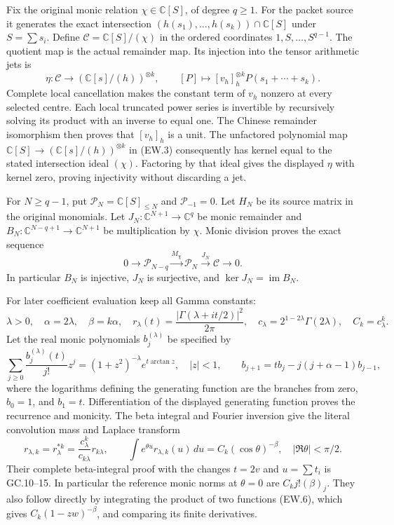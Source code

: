 \documentclass[11pt]{article}
\newcommand{\C}{\mathbb C}
\begin{document}
Fix the original monic relation $\chi\in\C[S]$, of degree $q\ge1$.
For the packet source it generates the exact intersection
$(h(s_1),\ldots,h(s_k))\cap\C[S]$ under $S=\sum s_i$.
Define $\mathcal C=\C[S]/(\chi)$ in the ordered coordinates
$1,S,\ldots,S^{q-1}$. The quotient map is the actual remainder
map. Its injection into the tensor arithmetic jets is
\[
 \eta:\mathcal C\longrightarrow(\C[s]/(h))^{\otimes k},
 \qquad [P]\longmapsto[v_h]_h^{\otimes k}P(s_1+\cdots+s_k).
                                                               \tag{EW.3}
\]
Complete local cancellation makes the constant term of $v_h$ nonzero
at every selected centre. Each local truncated power series is
invertible by recursively solving its product with an inverse to
equal one. The Chinese remainder isomorphism then proves that
$[v_h]_h$ is a unit. The unfactored polynomial map
$\C[S]\to(\C[s]/(h))^{\otimes k}$ in (EW.3) consequently has
kernel equal to the stated intersection ideal $(\chi)$. Factoring
by that ideal gives the displayed $\eta$ with kernel zero,
proving injectivity without discarding a jet.

For $N\ge q-1$, put $\mathcal P_N=\C[S]_{\le N}$ and
$\mathcal P_{-1}=0$. Let $H_N$ be its source matrix in the original
monomials. Let $J_N:\C^{N+1}\to\C^q$ be monic remainder
and $B_N:\C^{N-q+1}\to\C^{N+1}$ be multiplication by $\chi$.
Monic division proves the exact sequence
\[
 0\longrightarrow\mathcal P_{N-q}
 \xrightarrow{M_\chi}\mathcal P_N
 \xrightarrow{J_N}\mathcal C\longrightarrow0.                \tag{EW.4}
\]
In particular $B_N$ is injective, $J_N$ is surjective, and
$\ker J_N=\operatorname{im}B_N$.

For later coefficient evaluation keep all Gamma constants:
\[
 \lambda>0,\quad\alpha=2\lambda,\quad\beta=k\alpha,\quad
 r_\lambda(t)=\frac{|\Gamma(\lambda+it/2)|^2}{2\pi},\quad
 c_\lambda=2^{1-2\lambda}\Gamma(2\lambda),\quad C_k=c_\lambda^k.
                                                               \tag{EW.5}
\]
Let the real monic polynomials $b_j^{(\lambda)}$ be specified by
\[
 \sum_{j\ge0}\frac{b_j^{(\lambda)}(t)}{j!}z^j
 =(1+z^2)^{-\lambda}e^{t\arctan z},\quad |z|<1,
 \qquad
 b_{j+1}=tb_j-j(j+\alpha-1)b_{j-1},                          \tag{EW.6}
\]
where the logarithms defining the generating function are the branches
from zero, $b_0=1$, and $b_1=t$. Differentiation of the displayed
generating function proves the recurrence and monicity. The beta
integral and Fourier inversion give the literal convolution mass and
Laplace transform
\[
 r_{\lambda,k}=r_\lambda^{*k}
   =\frac{c_\lambda^k}{c_{k\lambda}}r_{k\lambda},\qquad
 \int e^{\theta u}r_{\lambda,k}(u)\,du
    =C_k(\cos\theta)^{-\beta},\quad |\Re\theta|<\pi/2.
                                                               \tag{EW.7}
\]
Their complete beta-integral proof with the changes $t=2v$ and
$u=\sum t_i$ is GC.10--15. In particular the reference monic norms
at $\theta=0$ are $C_kj!(\beta)_j$. They also follow directly by
integrating the product of two functions (EW.6), which gives
$C_k(1-zw)^{-\beta}$, and comparing its finite derivatives.
\end{document}
